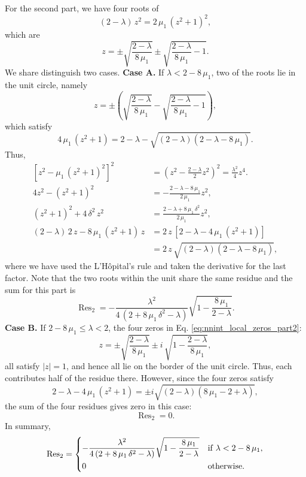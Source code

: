 \documentclass[reprint, floatfix]{revtex4-1}
\begin{document}
{For the second part,
we have four roots of
$$
(2 - \lambda) \, z^2 = 2 \, \mu_1 \, (z^2 + 1)^2,
$$
which are
\begin{equation}
z
=
\pm
\sqrt { \frac{ 2 - \lambda }
             { 8 \, \mu_1  } }
\pm
\sqrt { \frac{ 2 - \lambda }
             { 8 \, \mu_1  } - 1 }.
\label{eq:nnint_local_zeros_part2}
\end{equation}
We share distinguish two cases.
\textbf{Case A.}
If $\lambda < 2 - 8 \, \mu_1$,
two of the roots lie in the unit circle, namely
$$
z
=
\pm
\left(
\sqrt { \frac{ 2 - \lambda }
             { 8 \, \mu_1  } }
-
\sqrt { \frac{ 2 - \lambda }
             { 8 \, \mu_1  } - 1 }
\right),
$$
which satisfy
$$
4 \, \mu_1 \, ( z^2 + 1)
=
2 - \lambda
-
\sqrt{ ( 2 - \lambda ) ( 2 - \lambda - 8 \, \mu_1 ) }.
$$
Thus,
$$
\begin{aligned}
\left[ z^2 - \mu_1 \, \left( z^2 + 1 \right)^2 \right]^2
&=
\left( z^2 - \tfrac{ 2 - \lambda } { 2 } z^2 \right)^2
=
\frac{ \lambda^2 } { 4 } z^4.
\\
%
4 z^2 - \left( z^2 + 1 \right)^2
&=
-\frac{ 2 - \lambda - 8 \, \mu_1  } { 2 \, \mu_1 } z^2,
\\
%
\left( z^2 + 1 \right)^2 + 4 \, \delta^2 \, z^2
&=
\frac{ 2 - \lambda + 8 \, \mu_1 \, \delta^2 }
     { 2 \, \mu_1 }
     z^2,
\\
%
(2 - \lambda) \, 2 \, z
-
8 \, \mu_1 \, \left( z^2 + 1 \right) \, z
&=
2 \, z \, \left[2 - \lambda - 4 \,  \mu_1 \, (z^2 + 1) \right]
\\
&= 2 \, z \, \sqrt{ (2 - \lambda) ( 2 - \lambda - 8 \, \mu_1 ) },
\end{aligned}
$$
where we have used the L'H\^{o}pital's rule
and taken the derivative for the last factor.
%
Note that the two roots within the unit share the same
residue and the sum for this part is
%
$$
\operatorname{Res}_2
=
-\frac{                 \lambda^2                     }
      { 4 \, ( 2 + 8 \, \mu_1 \, \delta^2 - \lambda ) }
\sqrt{ 1 - \frac{ 8 \, \mu_1 } { 2 - \lambda } }.
$$
%
\textbf{Case B.}
If $2 - 8 \, \mu_1 \le \lambda < 2$,
the four zeros in Eq. \eqref{eq:nnint_local_zeros_part2}:
%
\begin{equation}
z
=
\pm
\sqrt { \frac{ 2 - \lambda }
             { 8 \, \mu_1  } }
\pm i \,
\sqrt { 1 - \frac{ 2 - \lambda }
                 { 8 \, \mu_1  } },
\label{eq:nnint_local_zeros_part2b}
\end{equation}
%
all satisfy $|z| = 1$, and hence
all lie on the border of the unit circle.
%
Thus, each contributes half of the residue there.
%
However, since the four zeros satisfy
$$
2 - \lambda - 4 \, \mu_1 \, ( z^2 + 1)
=
\pm i
\sqrt{ ( 2 - \lambda ) ( 8 \, \mu_1 - 2 + \lambda ) },
$$
the sum of the four residues gives zero in this case:
$$
\operatorname{Res}_2 = 0.
$$
In summary,
$$
\operatorname{Res}_2
=
\begin{dcases}
-\frac{                 \lambda^2                     }
      { 4 \, ( 2 + 8 \, \mu_1 \, \delta^2 - \lambda ) }
\sqrt{ 1 - \frac{ 8 \, \mu_1 } { 2 - \lambda } }
&
\mathrm{if \;}
\lambda < 2 - 8 \, \mu_1,
\\
0
&
\mathrm{otherwise}.
\end{dcases}
$$


}
\end{document}
